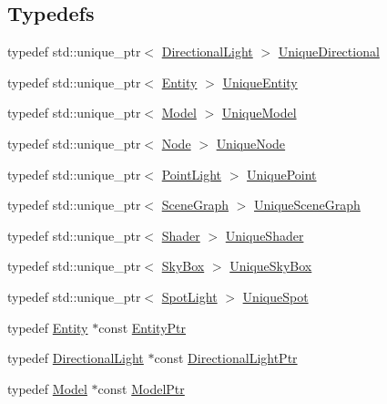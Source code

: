 \subsection*{Typedefs}
\begin{DoxyCompactItemize}
\item 
typedef std\+::unique\+\_\+ptr$<$ \hyperlink{structLarp_1_1DirectionalLight}{Directional\+Light} $>$ \hyperlink{namespaceLarp_af87ce889468b60d51aa1479335ba19bf}{Unique\+Directional}
\item 
typedef std\+::unique\+\_\+ptr$<$ \hyperlink{classLarp_1_1Entity}{Entity} $>$ \hyperlink{namespaceLarp_ad6d203c6dc3d8ea7a5517a64e1665403}{Unique\+Entity}
\item 
typedef std\+::unique\+\_\+ptr$<$ \hyperlink{classLarp_1_1Model}{Model} $>$ \hyperlink{namespaceLarp_a6e9a93e4118b723d56766c7ae7e1e94a}{Unique\+Model}
\item 
typedef std\+::unique\+\_\+ptr$<$ \hyperlink{classLarp_1_1Node}{Node} $>$ \hyperlink{namespaceLarp_ad95a88bc34f8c78cefd64c9bbeb94a58}{Unique\+Node}
\item 
typedef std\+::unique\+\_\+ptr$<$ \hyperlink{structLarp_1_1PointLight}{Point\+Light} $>$ \hyperlink{namespaceLarp_acd7cacff15535544525abc2e90e07b91}{Unique\+Point}
\item 
typedef std\+::unique\+\_\+ptr$<$ \hyperlink{classLarp_1_1SceneGraph}{Scene\+Graph} $>$ \hyperlink{namespaceLarp_a81a0d129ec1fc8f1f9fa231fbba6b19b}{Unique\+Scene\+Graph}
\item 
typedef std\+::unique\+\_\+ptr$<$ \hyperlink{classLarp_1_1Shader}{Shader} $>$ \hyperlink{namespaceLarp_a0e50ce889dd41e1be4ced22511b7f80a}{Unique\+Shader}
\item 
typedef std\+::unique\+\_\+ptr$<$ \hyperlink{classLarp_1_1SkyBox}{Sky\+Box} $>$ \hyperlink{namespaceLarp_a9acaa85c01aee19dafa995b4eba59bd0}{Unique\+Sky\+Box}
\item 
typedef std\+::unique\+\_\+ptr$<$ \hyperlink{structLarp_1_1SpotLight}{Spot\+Light} $>$ \hyperlink{namespaceLarp_a288b58c470c3ed41d3b23e764ba5b6eb}{Unique\+Spot}
\item 
typedef \hyperlink{classLarp_1_1Entity}{Entity} $\ast$const \hyperlink{namespaceLarp_a775efcc4cabb308d50168c52df343353}{Entity\+Ptr}
\item 
typedef \hyperlink{structLarp_1_1DirectionalLight}{Directional\+Light} $\ast$const \hyperlink{namespaceLarp_a38725e08be7b2ebb94f5f71eb0f0c692}{Directional\+Light\+Ptr}
\item 
typedef \hyperlink{classLarp_1_1Model}{Model} $\ast$const \hyperlink{namespaceLarp_a1fbc1dec59f7a571dc06e152b1e7d38c}{Model\+Ptr}

\end{DoxyCompactItemize}
